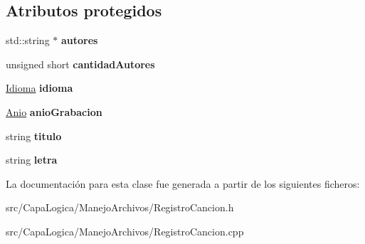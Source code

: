 \subsection*{\-Atributos protegidos}
\begin{DoxyCompactItemize}
\item 
\hypertarget{class_registro_cancion_aa034c16405c230413714316d1ce6b3cb}{std\-::string $\ast$ {\bfseries autores}}\label{class_registro_cancion_aa034c16405c230413714316d1ce6b3cb}

\item 
\hypertarget{class_registro_cancion_ace1c139ee8876d31296ecc28908bf12b}{unsigned short {\bfseries cantidad\-Autores}}\label{class_registro_cancion_ace1c139ee8876d31296ecc28908bf12b}

\item 
\hypertarget{class_registro_cancion_ab88fd6fe385f08956750cde2ac285f3b}{\hyperlink{class_idioma}{\-Idioma} {\bfseries idioma}}\label{class_registro_cancion_ab88fd6fe385f08956750cde2ac285f3b}

\item 
\hypertarget{class_registro_cancion_a493db8d8192f4067839d206e8c411d6c}{\hyperlink{class_anio}{\-Anio} {\bfseries anio\-Grabacion}}\label{class_registro_cancion_a493db8d8192f4067839d206e8c411d6c}

\item 
\hypertarget{class_registro_cancion_a0309ccbbb1900f92a2a4565cd5573ba1}{string {\bfseries titulo}}\label{class_registro_cancion_a0309ccbbb1900f92a2a4565cd5573ba1}

\item 
\hypertarget{class_registro_cancion_abd4bc78edefb9436ce832c0ac9ec7196}{string {\bfseries letra}}\label{class_registro_cancion_abd4bc78edefb9436ce832c0ac9ec7196}

\end{DoxyCompactItemize}


\-La documentación para esta clase fue generada a partir de los siguientes ficheros\-:\begin{DoxyCompactItemize}
\item 
src/\-Capa\-Logica/\-Manejo\-Archivos/\-Registro\-Cancion.\-h\item 
src/\-Capa\-Logica/\-Manejo\-Archivos/\-Registro\-Cancion.\-cpp\end{DoxyCompactItemize}
